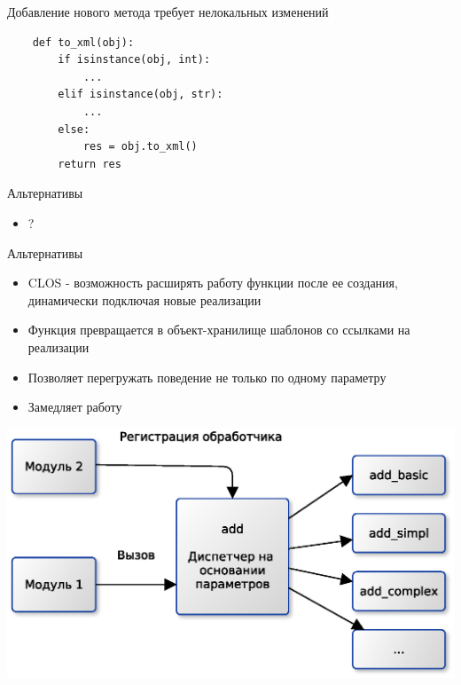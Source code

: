 \documentclass{article}
\begin{document}
\begin{center} Добавление нового метода требует нелокальных изменений \end{center}
\begin{lstlisting}
    def to_xml(obj):
        if isinstance(obj, int):
            ...
        elif isinstance(obj, str):
            ...
        else:
            res = obj.to_xml()
        return res
\end{lstlisting}
\newpage

\begin{center} Альтернативы \end{center}
\begin{itemize}
    \item ?
\end{itemize}
\newpage

\begin{center} Альтернативы \end{center}
\begin{itemize}
    \item CLOS - возможность расширять работу функции после ее создания,
          динамически подключая новые реализации
    \item Функция превращается в объект-хранилище шаблонов со ссылками на реализации
    \item Позволяет перегружать поведение не только по одному параметру
    \item Замедляет работу
\end{itemize}
\begin{center} \includegraphics[scale=0.8]{images/CLOS.eps} \end{center} 
\newpage
\end{document}
